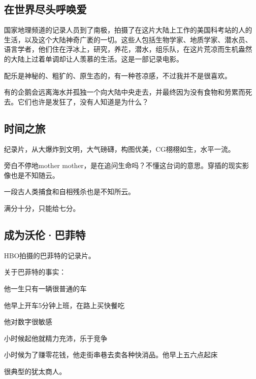 \subsection{在世界尽头呼唤爱}

国家地理频道的记录人员到了南极，拍摄了在这片大陆上工作的美国科考站的人的生活，以及这个大陆神奇广袤的一切。这些人包括生物学家、地质学家、潜水员、语言学者，他们住在浮冰上，研究，养花，潜水，组乐队，在这片荒凉而生机盎然的大陆上过着单调却让人羡慕的生活。这是一部记录电影。

配乐是神秘的、粗犷的、原生态的，有一种苍凉感，不过我并不是很喜欢。

有的企鹅会远离海水并孤独一个向大陆中央走去，并最终因为没有食物和劳累而死去。它们也许是发狂了，没有人知道是为什么？

\subsection{时间之旅}

纪录片，从大爆炸到文明，大气磅礴，构图优美，CG栩栩如生，水平一流。

旁白不停地mother mother，是在追问生命吗？不懂这台词的意思。穿插的现实影像也是不知随云。

一段古人类捕食和自相残杀也是不知所云。

满分十分，只能给七分。

\subsection{成为沃伦·巴菲特}

HBO拍摄的巴菲特的记录片。

关于巴菲特的事实：
\begin{itemize*}
    \item 他一生只有一辆很普通的车
    \item 他早上开车5分钟上班，在路上买快餐吃
    \item 他对数字很敏感
    \item 小时候起他就精力充沛，乐于竞争
    \item 小时候为了赚零花钱，他走街串巷去卖各种快消品。他早上五六点起床
\end{itemize*}

很典型的犹太商人。